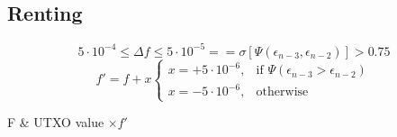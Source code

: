 \documentclass[../Bitcoin Blink.tex]{subfiles}
\begin{document}
\normalsize
\subsection{Renting}
\begin{equation*}
5 \cdot 10^{-4} \leq \Delta f \leq 5 \cdot 10^{-5} == \sigma [\Psi (\epsilon_{n-3}, \epsilon_{n-2})] > 0.75
\end{equation*}
\begin{equation*}
f'=f+x \begin{cases}
x=+5 \cdot 10^{-6}, & \text{if } \Psi (\epsilon_{n-3} > \epsilon_{n-2})\\
x=-5 \cdot 10^{-6}, & \text{otherwise}
\end{cases}
\end{equation*}
\begin{conditions}
F & UTXO value $\times f'$ 
\end{conditions}
\end{document}
